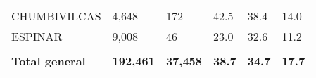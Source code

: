 \begin{tabular}{llllll}
	\cellcolor[HTML]{F8CBAD}CHUMBIVILCAS                           & 4,648                                                                 & 172                                                              & 42.5                                                                             & 38.4                                                                        & 14.0                                                                                \\
	\cellcolor[HTML]{F8CBAD}ESPINAR                                & 9,008                                                                 & 46                                                               & 23.0                                                                             & 32.6                                                                        & 11.2                                                                                \\
	&                                                                       &                                                                  &                                                                                  &                                                                             &                                                                                     \\
	\rowcolor[HTML]{DDEBF7} 
	\textbf{Total   general}                                       & \textbf{192,461}                                                      & \textbf{37,458}                                                  & \textbf{38.7}                                                                    & \textbf{34.7}                                                               & \textbf{17.7}                                                                      
\end{tabular}